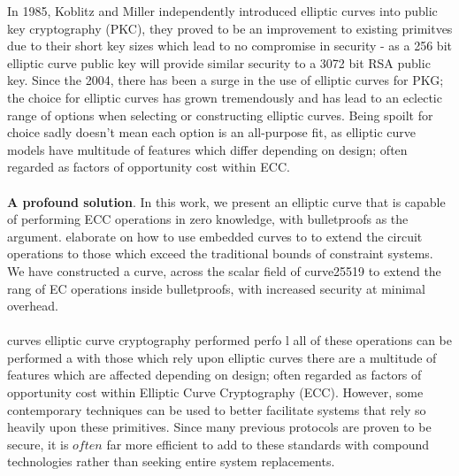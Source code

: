 \documentclass{article}
\theoremstyle{definition}
\theoremstyle{remark}
\begin{document}
	In 1985, Koblitz and  Miller independently introduced elliptic curves into public key cryptography (PKC), they proved to be an improvement to existing primitves due to their short key sizes which lead to no compromise in security - as a 256 bit elliptic curve public key will provide similar security to a 3072 bit RSA public key. Since the 2004, there has been a surge in the use of elliptic curves for PKG; the choice for elliptic curves has grown tremendously and has lead to an eclectic range of options when selecting or constructing elliptic curves. Being spoilt for choice sadly doesn't mean each option is an all-purpose fit, as elliptic curve models have multitude of features which differ depending on design; often regarded as factors of opportunity cost within ECC.  \\\\
	
	{\bf A profound solution}. In this work, we present an elliptic curve that is capable of performing ECC operations in zero knowledge, with bulletproofs as the argument. elaborate on how to use embedded curves to to extend the circuit operations to those which exceed the traditional bounds of constraint systems. We have constructed a curve, across the scalar field of curve25519 to extend the rang of EC operations inside bulletproofs, with increased security at minimal overhead.\\\\
	
	curves elliptic curve cryptography performed perfo l all of these operations can be performed  a with those which rely upon elliptic curves  there are a multitude of features which are affected depending on design; often regarded as factors of opportunity cost  within Elliptic Curve Cryptography (ECC). However, some contemporary techniques can be used to better facilitate systems that rely so heavily upon these primitives. Since many previous protocols are proven to be secure, it is $often$ far more efficient to add to these standards with compound technologies rather than seeking entire system replacements. \\\\ 
	
\end{document}
